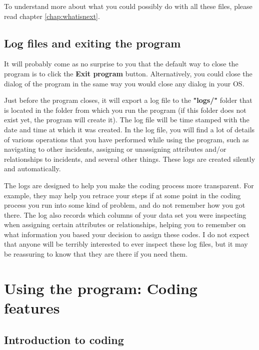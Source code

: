 \documentclass{memoir}
\begin{document}
To understand more about what you could possibly do with all these files, please read chapter \ref{chap:whatisnext}.


\section{Log files and exiting the program}
\label{sec:logfilesandexiting}

It will probably come as no surprise to you that the default way to close the program is to click the \textbf{Exit program} button. Alternatively, you could close the dialog of the program in the same way you would close any dialog in your OS.

Just before the program closes, it will export a log file to the \textbf{"logs/"} folder that is located in the folder from which you run the program (if this folder does not exist yet, the program will create it). The log file will be time stamped with the date and time at which it was created. In the log file, you will find a lot of details of various operations that you have performed while using the program, such as navigating to other incidents, assigning or unassigning attributes and/or relationships to incidents, and several other things. These logs are created silently and automatically.

The logs are designed to help you make the coding process more transparent. For example, they may help you retrace your steps if at some point in the coding process you run into some kind of problem, and do not remember how you got there. The log also records which columns of your data set you were inspecting when assigning certain attributes or relationships, helping you to remember on what information you based your decision to assign these codes. I do not expect that anyone will be terribly interested to ever inspect these log files, but it may be reassuring to know that they are there if you need them.  


\chapter{Using the program: Coding features}
\label{chap:usingtheprogram2}

\section{Introduction to coding}
\label{sec:introductiontocoding}
\end{document}

